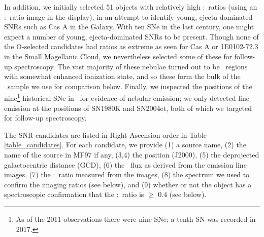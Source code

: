 In addition, we initially selected 51 objects with relatively high \oiii:\ha\ ratios (using an \oiii:\ha\ ratio image in the display), in an attempt to identify young, ejecta-dominated SNRs such as Cas A in the Galaxy. With ten SNe in the last century, one might expect a number of young, ejecta-dominated SNRs to be present.  Though none of the O-selected candidates had ratios as extreme as seen for Cas A or 1E0102-72.3 in the Small Magellanic Cloud, we nevertheless selected some of these for follow-up spectroscopy.  The vast majority of these nebulae turned out to be \hii\ regions with somewhat enhanced ionization state, and so these form the bulk of the \hii\ sample we use for comparison below. Finally, we inspected the positions of the nine\footnote{As of the 2011 observations there were nine SNe; a tenth SN was recorded in 2017.} historical SNe in \gal\ for evidence of nebular emission; we only detected line emission at the positions of SN1980K and SN2004et, both of which we targeted for follow-up spectroscopy.


The SNR candidates are listed in Right Ascension order in Table \ref{table_candidates}.  For each candidate, we provide (1) a source name, (2) the name of the source in MF97 if any,  (3,4) the position  (J2000), (5) the deprojected galactocentric distance (GCD), (6) the \ha\ flux as derived from the emission line images, (7) the \sii:\ha\ ratio measured from the images, (8) the spectrum we used to confirm the imaging ratios (see below), and (9) whether or not the object has a spectroscopic confirmation that the  \sii:\ha\ ratio is $\ge$ 0.4 (see below).


